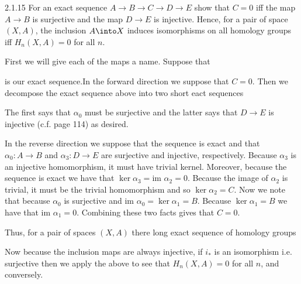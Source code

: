 \documentclass{article}
\newcommand{\im}{\text{im }}
\begin{document}
\begin{exercise}{2.1.15}{\parindent}
  For an exact sequence $A \to B \to C \to D \to E$ show that $C = 0$
  iff the map $A \to B$ is surjective and the map $D \to E$ is
  injective. Hence, for a pair of space $(X,A)$, the inclusion $A
  \into X$ induces isomorphisms on all homology groups iff $H_n(X,A) =
  0$ for all $n$.
\end{exercise}
\begin{solution}{\parindent}
  First we will give each of the maps a name. Suppose that
  \begin{center}
  \end{center}
  is our exact sequence.In the forward direction we suppose that $C =
  0$. Then we decompose the exact sequence above into two short eact
  sequences
  \begin{center}
  \end{center}
  The first says that $\alpha_0$ must be surjective and the latter
  says that $D \to E$ is injective (c.f. page 114) as desired.

  In the reverse direction we suppose that the sequence is exact and
  that $\alpha_0: A \to B$ and $\alpha_3: D \to E$ are surjective and
  injective, respectively. Because $\alpha_3$ is an injective
  homomorphism, it must have trivial kernel. Moreover, because the
  sequence is exact we have that $\ker \alpha_3 = \im \alpha_2 =
  0$. Because the image of $\alpha_2$ is trivial, it must be the
  trivial homomorphism and so $\ker \alpha_2 = C$. Now we note that
  because $\alpha_0$ is surjective and $\im \alpha_0 = \ker \alpha_1 =
  B$. Because $\ker \alpha_1 = B$ we have that $\im \alpha_1 =
  0$. Combining these two facts gives that $C = 0$.

  Thus, for a pair of spaces $(X,A)$ there long exact sequence of
  homology groups
  \begin{center}
  \end{center}
  Now because the inclusion maps are always injective, if $i_\ast$ is
  an isomorphism i.e. surjective then we apply the above to see that
  $H_n(X,A) = 0$ for all $n$, and conversely. 
\end{solution}
\end{document}
